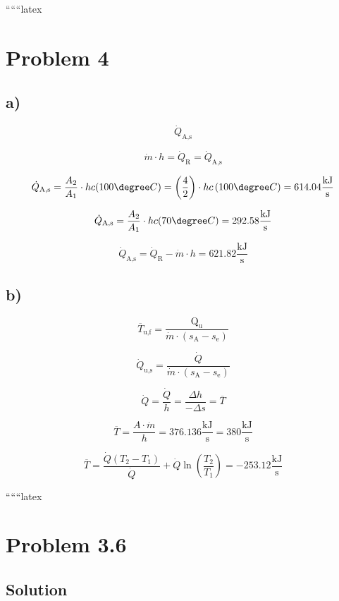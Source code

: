 
``````latex


\section*{Problem 4}

\subsection*{a)}

\[
\dot{Q}_{\text{A,s}}
\]

\[
\dot{m} \cdot h = \dot{Q}_{\text{R}} = \dot{Q}_{\text{A,s}}
\]

\[
\dot{Q}_{\text{A,s}} = \frac{A_2}{A_1} \cdot h c (100 \degree C) = \left( \frac{4}{2} \right) \cdot h c \left( 100 \degree C \right) = 614.04 \frac{\text{kJ}}{\text{s}}
\]

\[
\dot{Q}_{\text{A,s}} = \frac{A_2}{A_1} \cdot h c (70 \degree C) = 292.58 \frac{\text{kJ}}{\text{s}}
\]

\[
\dot{Q}_{\text{A,s}} = \dot{Q}_{\text{R}} - \dot{m} \cdot h = 621.82 \frac{\text{kJ}}{\text{s}}
\]

\subsection*{b)}

\[
\overline{T}_{\text{u,f}} = \frac{\text{Q}_{\text{u}}}{\dot{m} \cdot (s_{\text{A}} - s_{\text{e}})}
\]

\[
\dot{Q}_{\text{u,s}} = \frac{\dot{Q}}{\dot{m} \cdot (s_{\text{A}} - s_{\text{e}})}
\]

\[
\dot{Q} = \frac{\dot{Q}}{h} = \frac{\Delta h}{-\Delta s} = \overline{T}
\]

\[
\overline{T} = \frac{A \cdot \dot{m}}{h} = 376.136 \frac{\text{kJ}}{\text{s}} = 380 \frac{\text{kJ}}{\text{s}}
\]

\[
\overline{T} = \frac{\dot{Q} (T_2 - T_1)}{\dot{Q}} + \dot{Q} \ln \left( \frac{T_2}{T_1} \right) = -253.12 \frac{\text{kJ}}{\text{s}}
\]

``````latex


\section*{Problem 3.6}

\subsection*{Solution}

